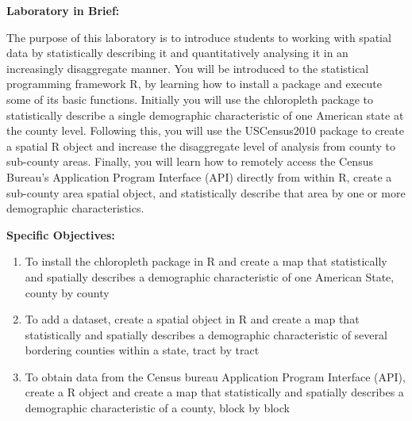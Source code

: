 \documentclass{article}
\begin{document}
\newpage


\large{\textbf{Laboratory in Brief:}}

\vspace{4mm}

\setlength{\leftskip}{1cm}

\setlength{\parindent}{0cm}

The purpose of this laboratory is to introduce students to working with spatial data by statistically describing it and quantitatively analysing it in an increasingly disaggregate manner.  You will be introduced to the statistical programming framework R, by learning how to install a package and execute some of its basic functions.  Initially you will use the chloropleth package to statistically describe a single demographic characteristic of one American state at the county level.  Following this, you will use the USCensus2010 package to create a spatial R object and increase the disaggregate level of analysis from county to sub-county areas.  Finally, you will learn how to remotely access the Census Bureau's Application Program Interface (API) directly from within R, create a sub-county area spatial object, and statistically describe that area by one or more demographic characteristics.

\vspace{4mm}

\setlength{\leftskip}{0cm}

\large{\textbf{Specific Objectives:}}

\begin{enumerate}[leftmargin=15mm]

\item To install the chloropleth package in R and create a map that statistically and spatially describes a demographic characteristic of one American State, county by county

\item To add a dataset, create a spatial object in R and create a map that statistically and spatially describes a demographic characteristic of several bordering counties within a state, tract by tract

\item To obtain data from the Census bureau Application Program Interface (API), create a R object and create a map that statistically and spatially describes a demographic characteristic of a county, block by block

\end{enumerate}
\end{document}
